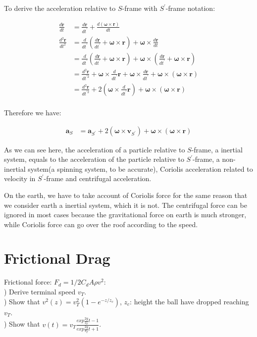 \documentclass[11pt, a4paper, oneside]{book}
\numberwithin{equation}{section}%
\begin{document}
To derive the acceleration relative to $ S $-frame with $ S^{'} $-frame notation:

\begin{align}
	\frac{d\dot{\bm{r}}}{dt} &= \frac{d\dot{\bm{r}}}{dt^{'}}+\frac{d(\bm{\omega}\times \bm{r})}{dt}\\
	\frac{d^2\bm{r}}{dt^2} &= \frac{d}{dt^{'}} (\frac{d\bm{r}}{dt^{'}}+\bm{\omega}\times \bm{r}) + \bm{\omega}\times \frac{d\bm{r}}{dt}\\
	&= \frac{d}{dt^{'}} (\frac{d\bm{r}}{dt^{'}} + \bm{\omega}\times \bm{r}) + \bm{\omega} \times (\frac{d\bm{r}}{dt^{'}}+\bm{\omega}\times \bm{r})\\
	&= \frac{d^2 \bm{r}}{dt^{'2}} + \bm{\omega}\times \frac{d}{dt^{'}} \bm{r} + \bm{\omega} \times \frac{d\bm{r}}{dt^{'}} + \bm{\omega} \times (\bm{\omega}\times \bm{r})\\
	&= \frac{d^2 \bm{r}}{dt^{'2}} + 2(\bm{\omega}\times \frac{d}{dt^{'}} \bm{r}) + \bm{\omega} \times (\bm{\omega}\times \bm{r})\\
\end{align}
	
	Therefore we have: 
	
\begin{align}
	\bm{a}_S &= \bm{a}_{S^{'}} + 2 (\bm{\omega} \times \bm{v}_{S^{'}}) + \bm{\omega} \times (\bm{\omega}\times \bm{r})
\end{align}

As we can see here, the acceleration of a particle relative to $ S $-frame, a inertial system, equals to the acceleration of the particle relative to $ S^{'} $-frame, a non-inertial system(a spinning system, to be accurate), Coriolis acceleration related to velocity in $ S^{'} $-frame and centrifugal acceleration.

On the earth, we have to take account of Coriolis force for the same reason that we consider earth a inertial system, which it is not. The centrifugal force can be ignored in most cases because the gravitational force on earth is much stronger, while Coriolis force can go over the roof according to the speed.





 
 
 

\section{Frictional Drag}

Frictional force: $ F_d = 1/2C_dA\rho v^2 $:\\
) Derive terminal speed $ v_T $.\\
) Show that $v^2(z) = v_T^2 (1 - e^{-z/z_c})$, $ z_c $: height the ball have dropped reaching $ v_T $.\\
) Show that $\displaystyle{v(t) = v_T\frac{exp{\frac{2g}{v_T}t}-1}{exp{\frac{2g}{v_T}t}+1}}$.
\end{document}
